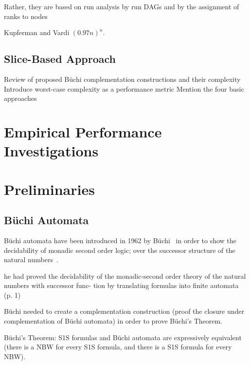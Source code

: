  Rather, they are based on run analysis by run DAGs and by the assignment of ranks to nodes 


Kupferman and Vardi $(0.97n)^n$. 



\subsection{Slice-Based Approach}


Review of proposed Büchi complementation constructions and their complexity
Introduce worst-case complexity as a performance metric
Mention the four basic approaches


\section{Empirical Performance Investigations}



\section{Preliminaries}
\subsection{Büchi Automata}
Büchi automata have been introduced in 1962 by Büchi~\cite{buchi1960decision} in order to show the decidability of monadic second order logic; over the successor structure of the natural numbers~\cite{2012_breuers}.

he had proved the decidability of the monadic-second order theory of the natural numbers with successor func- tion by translating formulas into finite automata~\cite{vardi2007automata} (p. 1)


Büchi needed to create a complementation construction (proof the closure under complementation of Büchi automata) in order to prove Büchi's Theorem.

Büchi's Theorem: S1S formulas and Büchi automata are expressively equivalent (there is a NBW for every S1S formula, and there is a S1S formula for every NBW).

